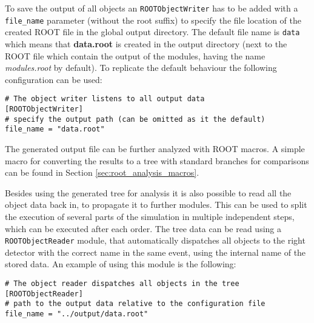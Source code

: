 To save the output of all objects an \texttt{ROOTObjectWriter} has to be added with a \texttt{file\_name} parameter (without the root suffix) to specify the file location of the created ROOT file in the global output directory. The default file name is \texttt{data} which means that \textbf{data.root} is created in the output directory (next to the ROOT file which contain the output of the modules, having the name \textit{modules.root} by default). To replicate the default behaviour the following configuration can be used:
\begin{verbatim}
# The object writer listens to all output data
[ROOTObjectWriter]
# specify the output path (can be omitted as it the default)
file_name = "data.root"
\end{verbatim}
The generated output file can be further analyzed with ROOT macros. A simple macro for converting the results to a tree with standard branches for comparisons can be found in Section \ref{sec:root_analysis_macros}.

Besides using the generated tree for analysis it is also possible to read all the object data back in, to propagate it to further modules. This can be used to split the execution of several parts of the simulation in multiple independent steps, which can be executed after each order. The tree data can be read using a \texttt{ROOTObjectReader} module, that automatically dispatches all objects to the right detector with the correct name in the same event, using the internal name of the stored data. An example of using this module is the following:
\begin{verbatim}
# The object reader dispatches all objects in the tree
[ROOTObjectReader]
# path to the output data relative to the configuration file
file_name = "../output/data.root"
\end{verbatim}

